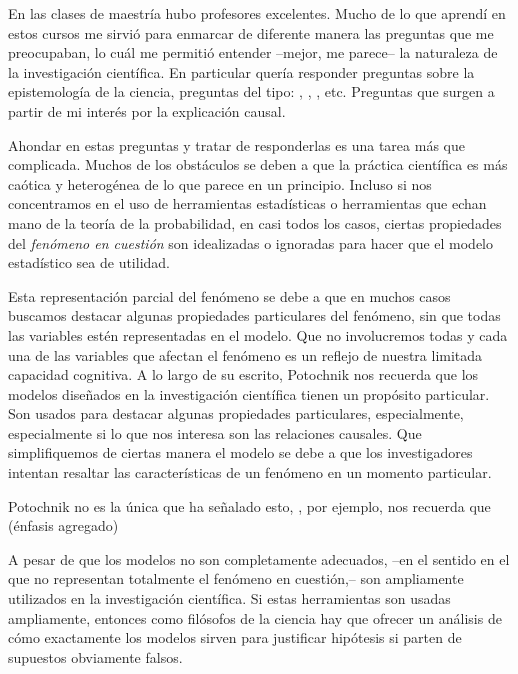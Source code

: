 En las clases de maestría hubo profesores excelentes.
Mucho de lo que aprendí en estos cursos me sirvió para enmarcar de diferente manera las preguntas que me preocupaban, lo cuál me permitió entender --mejor, me parece-- la naturaleza de la investigación científica. 
En particular quería responder preguntas sobre la epistemología de la ciencia, preguntas del tipo: , , , etc. 
Preguntas que surgen a partir de mi interés por la explicación causal.

Ahondar en estas preguntas y tratar de responderlas es una tarea más que complicada. 
Muchos de los obstáculos se deben a que la práctica científica es más caótica y heterogénea de lo que parece en un principio. 
Incluso si nos concentramos en el uso de herramientas estadísticas o herramientas que echan mano de la teoría de la probabilidad, en casi todos los casos, ciertas propiedades del \emph{fenómeno en cuestión} son idealizadas o ignoradas para hacer que el modelo estadístico sea de utilidad.

Esta representación parcial del fenómeno se debe a que en muchos casos buscamos destacar algunas propiedades particulares del fenómeno, sin que todas las variables estén representadas en el modelo.
Que no involucremos todas y cada una de las variables que afectan el fenómeno es un reflejo de nuestra limitada capacidad cognitiva.
A lo largo de su escrito, Potochnik nos recuerda que los modelos diseñados en la investigación científica tienen un propósito particular. 
Son usados para destacar algunas propiedades particulares, especialmente, especialmente si lo que nos interesa son las relaciones causales. 
Que simplifiquemos de ciertas manera el modelo se debe a que los investigadores intentan resaltar las características de un fenómeno en un momento particular.

Potochnik no es la única que ha señalado esto,
\textcite[][p.24]{abrams2023evolution}, por ejemplo, nos recuerda que  (énfasis agregado) 

A pesar de que los modelos no son completamente adecuados, --en el sentido en el que no representan totalmente el fenómeno en cuestión,-- son ampliamente utilizados en la investigación científica. 
Si estas herramientas son usadas ampliamente, entonces como filósofos de la ciencia hay que ofrecer un análisis de cómo exactamente los modelos sirven para justificar hipótesis si parten de supuestos obviamente falsos.

